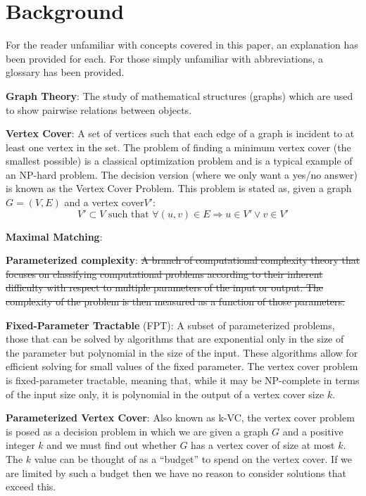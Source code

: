 \section{Background}

For the reader unfamiliar with concepts covered in this paper, an explanation
has been provided for each. For those simply unfamiliar with abbreviations, a
glossary has been provided.

\textbf{Graph Theory}: The study of mathematical structures (graphs) which are
used to show pairwise relations between objects.

\textbf{Vertex Cover}: A set of vertices such that each edge of a graph is
incident to at least one vertex in the set. The problem of finding a minimum
vertex cover (the smallest possible) is a classical optimization problem and is
a typical example of an NP-hard problem. The decision version (where we only
want a yes/no answer) is known as the Vertex Cover Problem. This problem is
stated as, given a graph \(G = (V, E)\) and a vertex cover\(V'\):
\[
    V' \subset V \text{ such that } \forall (u, v) \in E \Rightarrow u \in V' \vee v \in V'
\]

\textbf{Maximal Matching}:

\textbf{Parameterized complexity}: \sout{A branch of computational complexity
    theory that focuses on classifying computational problems according to
    their inherent difficulty with respect to multiple parameters of the input
    or output. The complexity of the problem is then measured as a function of
    those parameters.}

\textbf{Fixed-Parameter Tractable} (FPT): A subset of parameterized problems,
those that can be solved by algorithms that are exponential only in the size of
the parameter but polynomial in the size of the input. These algorithms allow
for efficient solving for small values of the fixed parameter. The vertex cover
problem is fixed-parameter tractable, meaning that, while it may be NP-complete
in terms of the input size only, it is polynomial in the output of a vertex
cover size \(k\).

\textbf{Parameterized Vertex Cover}: Also known as k-VC, the vertex cover
problem is posed as a decision problem in which we are given a graph \(G\) and
a positive integer \(k\) and we must find out whether \(G\) has a vertex cover
of size at most \(k\). The \(k\) value can be thought of as a ``budget'' to
spend on the vertex cover. If we are limited by such a budget then we have no
reason to consider solutions that exceed this.

